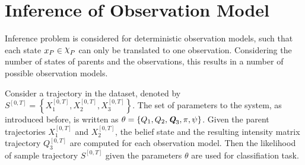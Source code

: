 \section{Inference of Observation Model}
\label{sec:inf_setup}
Inference problem is considered for deterministic observation models, such that each state $ x_P \in \rchi_P $ can only be translated to one observation. Considering the number of states of parents and the observations, this results in a number of possible observation models.\par
Consider a trajectory in the dataset, denoted by $ S^{[0,T]} = \left\lbrace X_1^{[0,T]} , X_2^{[0,T]}, X_3^{[0,T]}\right\rbrace $. The set of parameters to the system, as introduced before, is written as $  \theta = \left\lbrace  Q_{1}, Q_{2}, \textit{\textbf{Q}}_3, \pi, \psi \right\rbrace $. Given the parent trajectories $ X_1^{[0,T]} $ and $ X_2^{[0,T]} $, the belief state and the resulting intensity matrix trajectory $ Q_3^{[0,T]} $  are computed for each observation model. Then the likelihood of sample trajectory $ S^{[0,T]} $ given the parameters $ \theta $ are used for classifiation task.

